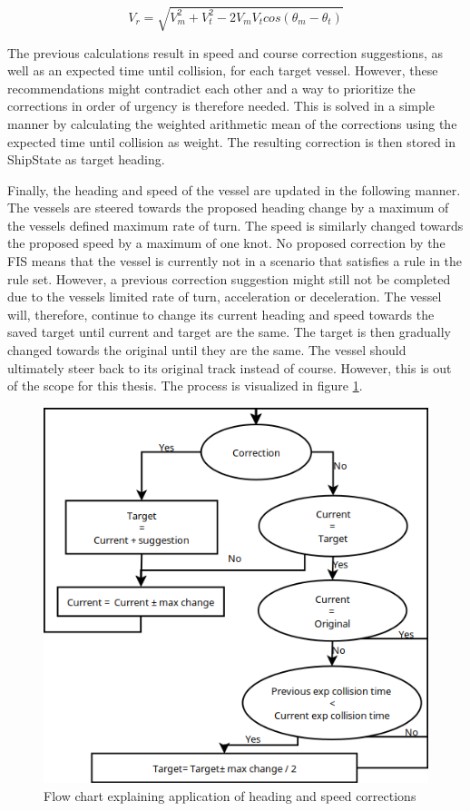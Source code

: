 \begin{equation}
    V_r=\sqrt{V_m^2 + V_t^2-2  V_mV_tcos(\theta_m-\theta_t)}
    \label{eq:rel_vel_calc}
\end{equation}

The previous calculations result in speed and course correction suggestions, as well as an expected time until collision, for each target vessel. However, these recommendations might contradict each other and a way to prioritize the corrections in order of urgency is therefore needed. This is solved in a simple manner by calculating the weighted arithmetic mean of the corrections using the expected time until collision as weight. The resulting correction is then stored in ShipState as target heading.

Finally, the heading and speed of the vessel are updated in the following manner. The vessels are steered towards the proposed heading change by a maximum of the vessels defined maximum rate of turn. The speed is similarly changed towards the proposed speed by a maximum of one knot. No proposed correction by the FIS means that the vessel is currently not in a scenario that satisfies a rule in the rule set. However, a previous correction suggestion might still not be completed due to the vessels limited rate of turn, acceleration or deceleration.  The vessel will, therefore, continue to change its current heading and speed towards the saved target until current and target are the same. The target is then gradually changed towards the original until they are the same. The vessel should ultimately steer back to its original track instead of course. However, this is out of the scope for this thesis. The process is visualized in figure \ref{fig:flow_chart}.
\begin{figure}[H]
    \centering
    \includegraphics[width=\textwidth,height=0.75\textheight,keepaspectratio]{Figures/flow.png}
    \caption{Flow chart explaining application of heading and speed corrections}
    \label{fig:flow_chart}
\end{figure}

